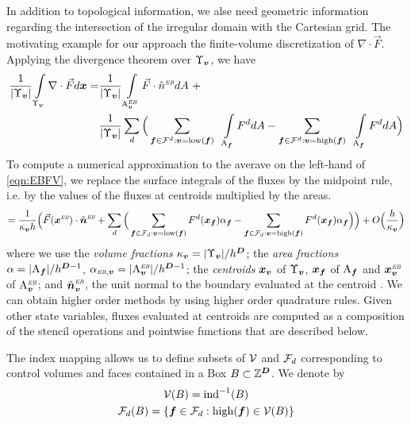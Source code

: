 \documentclass[12pt]{article}
\newcommand{\ind}{{\rm{ind}}}
\newcommand{\low}{{\rm{low}}}
\newcommand{\high}{{\rm{high}}}
\newcommand{\vol}[1]{{\Upsilon_{#1}}}
\newcommand{\area}[1]{{\rm{A}_{#1}}}
\newcommand{\vof}{{\mbf{v}}}
\newcommand{\face}{{\mbf{f}}}
\newcommand{\lr}[1]{{\langle #1 \rangle}}
\newcommand{\ebsub}{{\text{\it \tiny EB}}}
\newcommand{\areaEB}[1]{{{\rm A}_{#1}^{\ebsub}}}
\begin{document}
In addition to topological information, we alse need geometric information regarding the intersection of the irregular domain with the Cartesian grid. The motivating example for our approach the finite-volume discretization of $\nabla \cdot \vec{F}$. Applying the divergence theorem over $\vol{\vof}$, we have
\begin{align}
\frac{1}{|\vol{\vof}|} \int \limits_{\vol{\vof} } \nabla \cdot \vec{F} d \mbf{x} =  & \frac{1}{|\vol{\vof}|} \int \limits_{\areaEB{\vof}} \vec{F} \cdot \hat{n}^\ebsub d A ~ +  \nonumber
\\ & \frac{1}{|\vol{\vof}|} \sum \limits_d \Big ( \sum \limits_{\face \in \mcl{F}^d:\vof = \low(\face)} ~~ \int \limits_{\area{\face}} F^d dA -  \sum \limits_{\face \in \mcl{F}^d :\vof = \high(\face)}  ~~ \int \limits_{\area{\face}} F^d dA \Big )\label{eqn:EBFV} 
\end{align}
To compute a numerical approximation to the averave on the left-hand of \eqref{eqn:EBFV}, we replace the surface integrals of the fluxes by the midpoint rule, i.e. by the values of the fluxes at centroids multiplied by the areas. 
\begin{gather*}
= \frac{1}{\kappa_\vof h}\Big( \vec{F}(\mbf{x}^\ebsub ) \cdot \hat{\mbf{n}}^\ebsub +
\sum \limits_d \Big ( \sum \limits_{\face \in \mcl{F}_d:\vof = \low(\face)} F^d (\mbf{x}_\face ) \alpha_\face -  \sum \limits_{\face \in \mcl{F}_d :\vof = \high(\face)}   F^d (\mbf{x}_\face ) \alpha_\face \Big ) \Big ) + O \Big(\frac{h}{\kappa_\vof} \Big)
\end{gather*}
where we use the {\it volume fractions} $\kappa_\vof = |\vol{\vof} |/h^\DIM$; the {\it area fractions} $\alpha = | \area{\face} | / h^{\DIM-1}$, $\alpha_{\ebsub,\vof} = |\areaEB{\vof} | /  h^{\DIM-1}$; the {\it centroids} $\mbf{x}_\vof$ of $\Upsilon_\vof$,  $\mbf{x}_\face$ of $\area{\face}$ and $\mbf{x}_{\vof}^\ebsub$ of $\areaEB{\vof}$; and $\hat{\mbf{n}}_{\vof}^\ebsub$, the unit normal to the boundary evaluated at the centroid . We can obtain higher order methods by using higher order quadrature rules. Given other state variables, fluxes evaluated at centroids are computed as a composition of the stencil operations and pointwise functions that are described below.

The index mapping allows us to define subsets of ${\mathcal{V}}$ and ${\mathcal{F}}_d$ corresponding to control volumes and faces contained in a Box $B \subset \mathbb{Z}^{\boldsymbol{D}}$. We denote by 
\begin{gather*}
\mcl{V}(B) = \ind^{-1} (B) \\
\mcl{F}_d (B) = \{\face \in \mcl{F}_d: \high (\face ) \in \mcl{V}(B) \}
\end{gather*}
\end{document}
